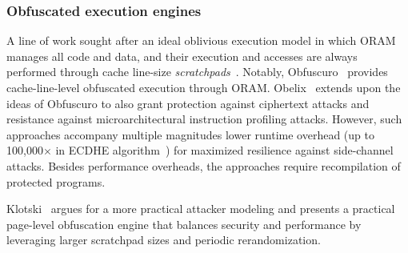 \subsubsection{Obfuscated execution engines}
A line of work sought after an ideal oblivious execution model in which ORAM manages all code and data, and their execution and accesses are always performed through cache line-size \emph{scratchpads}~\cite{ahmad2019obfuscuro,obelix}.
Notably, Obfuscuro~\cite{ahmad2019obfuscuro} provides cache-line-level obfuscated execution through ORAM.
Obelix~\cite{obelix} extends upon the ideas of Obfuscuro to also grant protection against ciphertext attacks and resistance against microarchitectural instruction profiling attacks.
However, such approaches accompany multiple magnitudes lower runtime overhead (up to 100,000$\times$ in ECDHE algorithm~\cite{obelix}) for maximized resilience against side-channel attacks.
Besides performance overheads, the approaches require recompilation of protected programs.

Klotski~\cite{zhang2020klotski} argues for a more practical attacker modeling and presents a practical page-level obfuscation engine that balances security and performance by leveraging larger scratchpad sizes and periodic rerandomization.






